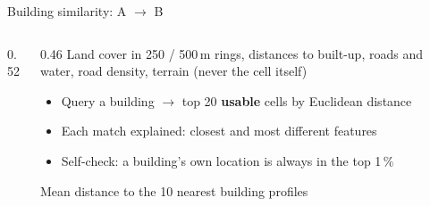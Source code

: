 \documentclass[aspectratio=169,11pt,t]{beamer}
\newcommand{\cls}[2]{\textcolor{#1}{\textbf{#2}}}
\begin{document}
\begin{frame}{Building similarity: A $\rightarrow$ B}
  \begin{columns}[T]
    \begin{column}{0.52\textwidth}
      \centering{}
      \par\vspace{5pt}\raggedright
    \end{column}
    \begin{column}{0.46\textwidth}
      \footnotesize
      Land cover in 250 / 500\,m rings, distances to built-up, roads and water, road density,
      terrain (never the cell itself)
      \begin{itemize}
        \item Query a building $\rightarrow$ top 20 \cls{usable}{usable} cells by Euclidean
              distance
        \item Each match explained: closest and most different features
        \item Self-check: a building's own location is always in the top 1\,\%
      \end{itemize}
      \vspace{3pt}
      Mean distance to the 10 nearest building profiles
    \end{column}
  \end{columns}
\end{frame}
\end{document}

